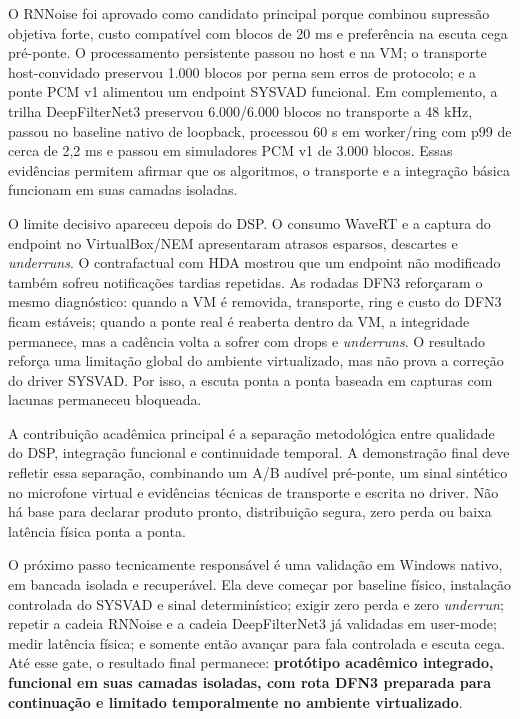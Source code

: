 O RNNoise foi aprovado como candidato principal porque combinou supressão objetiva forte, custo compatível com blocos de 20 ms e preferência na escuta cega pré-ponte. O processamento persistente passou no host e na VM; o transporte host-convidado preservou 1.000 blocos por perna sem erros de protocolo; e a ponte PCM v1 alimentou um endpoint SYSVAD funcional. Em complemento, a trilha DeepFilterNet3 preservou 6.000/6.000 blocos no transporte a 48 kHz, passou no baseline nativo de loopback, processou 60 s em worker/ring com p99 de cerca de 2,2 ms e passou em simuladores PCM v1 de 3.000 blocos. Essas evidências permitem afirmar que os algoritmos, o transporte e a integração básica funcionam em suas camadas isoladas.

O limite decisivo apareceu depois do DSP. O consumo WaveRT e a captura do endpoint no VirtualBox/NEM apresentaram atrasos esparsos, descartes e \textit{underruns}. O contrafactual com HDA mostrou que um endpoint não modificado também sofreu notificações tardias repetidas. As rodadas DFN3 reforçaram o mesmo diagnóstico: quando a VM é removida, transporte, ring e custo do DFN3 ficam estáveis; quando a ponte real é reaberta dentro da VM, a integridade permanece, mas a cadência volta a sofrer com drops e \textit{underruns}. O resultado reforça uma limitação global do ambiente virtualizado, mas não prova a correção do driver SYSVAD. Por isso, a escuta ponta a ponta baseada em capturas com lacunas permaneceu bloqueada.

A contribuição acadêmica principal é a separação metodológica entre qualidade do DSP, integração funcional e continuidade temporal. A demonstração final deve refletir essa separação, combinando um A/B audível pré-ponte, um sinal sintético no microfone virtual e evidências técnicas de transporte e escrita no driver. Não há base para declarar produto pronto, distribuição segura, zero perda ou baixa latência física ponta a ponta.

O próximo passo tecnicamente responsável é uma validação em Windows nativo, em bancada isolada e recuperável. Ela deve começar por baseline físico, instalação controlada do SYSVAD e sinal determinístico; exigir zero perda e zero \textit{underrun}; repetir a cadeia RNNoise e a cadeia DeepFilterNet3 já validadas em user-mode; medir latência física; e somente então avançar para fala controlada e escuta cega. Até esse gate, o resultado final permanece: \textbf{protótipo acadêmico integrado, funcional em suas camadas isoladas, com rota DFN3 preparada para continuação e limitado temporalmente no ambiente virtualizado}.

